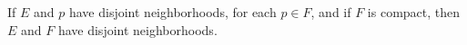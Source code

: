 If $E$ and $p$ have disjoint neighborhoods, for each $p \in F$, and if $F$ is compact, then $E$ and $F$ have disjoint neighborhoods.
